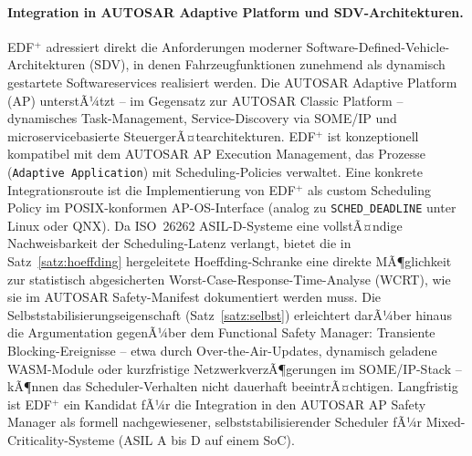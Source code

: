 ﻿\documentclass[a4paper,12pt]{article}
\theoremstyle{definition}
\begin{document}
	\paragraph{Integration in AUTOSAR Adaptive Platform und SDV-Architekturen.}
	EDF$^+$ adressiert direkt die Anforderungen moderner Software-Defined-Vehicle-Architekturen
	(SDV), in denen Fahrzeugfunktionen zunehmend als dynamisch gestartete Softwareservices
	realisiert werden. Die AUTOSAR Adaptive Platform (AP) unterstÃ¼tzt -- im Gegensatz zur
	AUTOSAR Classic Platform -- dynamisches Task-Management, Service-Discovery via SOME/IP
	und microservicebasierte SteuergerÃ¤tearchitekturen. EDF$^+$ ist konzeptionell kompatibel
	mit dem AUTOSAR AP Execution Management, das Prozesse (\texttt{Adaptive Application})
	mit Scheduling-Policies verwaltet. Eine konkrete Integrationsroute ist die Implementierung
	von EDF$^+$ als custom Scheduling Policy im POSIX-konformen AP-OS-Interface
	(analog zu \texttt{SCHED\_DEADLINE} unter Linux oder QNX).
	Da ISO~26262 ASIL-D-Systeme eine vollstÃ¤ndige Nachweisbarkeit der Scheduling-Latenz
	verlangt, bietet die in Satz~\ref{satz:hoeffding} hergeleitete Hoeffding-Schranke eine
	direkte MÃ¶glichkeit zur statistisch abgesicherten Worst-Case-Response-Time-Analyse
	(WCRT), wie sie im AUTOSAR Safety-Manifest dokumentiert werden muss.
	Die Selbststabilisierungseigenschaft (Satz~\ref{satz:selbst}) erleichtert darÃ¼ber hinaus
	die Argumentation gegenÃ¼ber dem Functional Safety Manager: Transiente Blocking-Ereignisse
	-- etwa durch Over-the-Air-Updates, dynamisch geladene WASM-Module oder kurzfristige
	NetzwerkverzÃ¶gerungen im SOME/IP-Stack -- kÃ¶nnen das Scheduler-Verhalten nicht dauerhaft
	beeintrÃ¤chtigen. Langfristig ist EDF$^+$ ein Kandidat fÃ¼r
	die Integration in den AUTOSAR AP Safety Manager als formell nachgewiesener, selbst\-stabilisierender Scheduler
	fÃ¼r Mixed-Criticality-Systeme (ASIL A bis D auf einem SoC).
\end{document}
